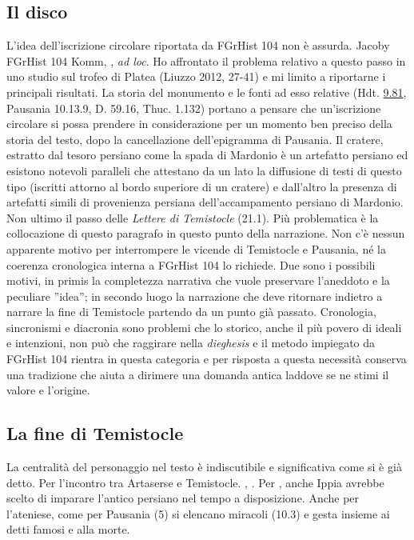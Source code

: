 {            \subsection*{Il disco}\label{bkm:RefHeading696961501267828}
            L'idea dell'iscrizione circolare riportata da FGrHist 104 non è assurda. Jacoby FGrHist 104 Komm, \cite{Pownall2011}, \emph{ad loc}. Ho affrontato il problema relativo a questo passo in uno studio sul trofeo di Platea (Liuzzo 2012, 27-41) e mi limito a riportarne i principali risultati. La storia del monumento e le fonti ad esso relative (Hdt. \href{http://data.perseus.org/citations/urn:cts:greekLit:tlg0016.tlg001.perseus-grc1:9.81}{9.81}, Pausania 10.13.9, D. 59.16, Thuc. 1.132) portano a pensare che un'iscrizione circolare si possa prendere in considerazione per un momento ben preciso della storia del testo, dopo la cancellazione dell'epigramma di Pausania. Il cratere, estratto dal tesoro persiano come la spada di Mardonio è un artefatto persiano ed esistono notevoli paralleli che attestano da un lato la diffusione di testi di questo tipo (iscritti attorno al bordo superiore di un cratere) e dall'altro la presenza di artefatti simili di provenienza persiana dell'accampamento persiano di Mardonio. Non ultimo il passo delle \emph{Lettere di Temistocle} (21.1). Più problematica è la collocazione di questo paragrafo in questo punto della narrazione. Non c'è nessun apparente motivo per interrompere le vicende di Temistocle e Pausania, né la coerenza cronologica interna a FGrHist 104 lo richiede. Due sono i possibili motivi, in primis la completezza narrativa che vuole preservare l'aneddoto e la peculiare ''idea''; in secondo luogo la narrazione che deve ritornare indietro a narrare la fine di Temistocle partendo da un punto già passato. Cronologia, sincronismi e diacronia sono problemi che lo storico, anche il più povero di ideali e intenzioni, non può che raggirare nella \emph{dieghesis} e il metodo impiegato da FGrHist 104 rientra in questa categoria e per risposta a questa necessità conserva una tradizione che aiuta a dirimere una domanda antica laddove se ne stimi il valore e l'origine.
            \subsection*{La fine di Temistocle}\label{bkm:RefHeading398631508721977}
           La centralità del personaggio nel testo è indiscutibile e significativa come si è già detto. Per l'incontro tra Artaserse  e Temistocle. \cite{Liuzzo2010}, \cite[35s]{Cagnazzi2001}. Per \cite[29]{Cagnazzi2001}, anche Ippia  avrebbe scelto di imparare l'antico persiano nel tempo a disposizione. Anche per l'ateniese, come per Pausania  (5) si elencano miracoli (10.3) e gesta insieme ai detti famosi e alla morte. 
}
